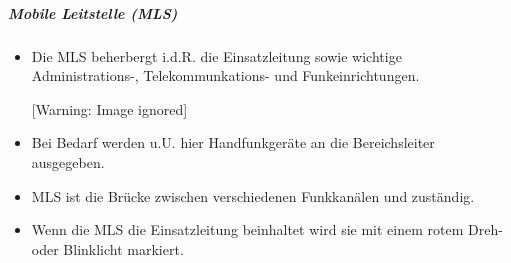 \documentclass{article}
\begin{document}
\subparagraph{Mobile Leitstelle (MLS)}
\begin{itemize}
\item Die MLS beherbergt i.d.R. die Einsatzleitung sowie wichtige
Administrations-, Telekommunkations- und Funkeinrichtungen. 

\begin{center}
 [Warning: Image ignored] %

\end{center}
\item Bei Bedarf werden u.U. hier Handfunkger\"ate an die Bereichsleiter
ausgegeben. 

\item MLS ist die Br\"ucke zwischen verschiedenen Funkkan\"alen und
zust\"andig. 

\item Wenn die MLS die Einsatzleitung beinhaltet wird sie mit einem
rotem Dreh- oder Blinklicht markiert. 

\end{itemize}
\end{document}
